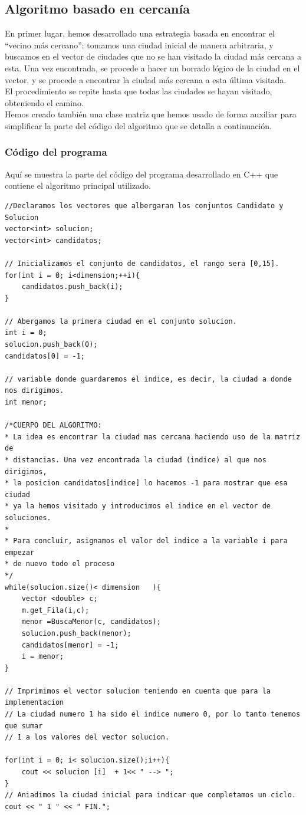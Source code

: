 \documentclass[11pt,a4paper]{article} %
\begin{document}
\subsection{Algoritmo basado en cercanía}

En primer lugar, hemos desarrollado una estrategia basada en encontrar el “vecino más cercano”: tomamos una ciudad inicial de manera arbitraria, y buscamos en el vector de ciudades que no se han visitado la ciudad más cercana a esta. Una vez encontrada, se procede a hacer un borrado lógico de la ciudad en el vector, y se procede a encontrar la ciudad más cercana a esta última visitada.\\

El procedimiento se repite hasta que todas las ciudades se hayan visitado, obteniendo el camino.\\

Hemos creado también una clase matriz que hemos usado de forma auxiliar para simplificar la parte del código del algoritmo que se detalla a continuación.\\

\subsubsection{Código del programa}
Aquí se muestra la parte del código del programa desarrollado en C++ que contiene el algoritmo principal utilizado.

\begin{lstlisting}[style=C++]
//Declaramos los vectores que albergaran los conjuntos Candidato y Solucion
vector<int> solucion;
vector<int> candidatos;

// Inicializamos el conjunto de candidatos, el rango sera [0,15]. 
for(int i = 0; i<dimension;++i){
	candidatos.push_back(i);
}

// Abergamos la primera ciudad en el conjunto solucion.
int i = 0;
solucion.push_back(0);
candidatos[0] = -1;

// variable donde guardaremos el indice, es decir, la ciudad a donde nos dirigimos.
int menor;

/*CUERPO DEL ALGORITMO:
* La idea es encontrar la ciudad mas cercana haciendo uso de la matriz de
* distancias. Una vez encontrada la ciudad (indice) al que nos dirigimos,
* la posicion candidatos[indice] lo hacemos -1 para mostrar que esa ciudad
* ya la hemos visitado y introducimos el indice en el vector de soluciones.
* 
* Para concluir, asignamos el valor del indice a la variable i para empezar
* de nuevo todo el proceso
*/
while(solucion.size()< dimension   ){
	vector <double> c;
	m.get_Fila(i,c);
	menor =BuscaMenor(c, candidatos);
	solucion.push_back(menor);
	candidatos[menor] = -1;
	i = menor;
}

// Imprimimos el vector solucion teniendo en cuenta que para la implementacion
// La ciudad numero 1 ha sido el indice numero 0, por lo tanto tenemos que sumar
// 1 a los valores del vector solucion.

for(int i = 0; i< solucion.size();i++){
	cout << solucion [i]  + 1<< " --> ";
}
// Aniadimos la ciudad inicial para indicar que completamos un ciclo.
cout << " 1 " << " FIN.";
\end{lstlisting}
\end{document}
